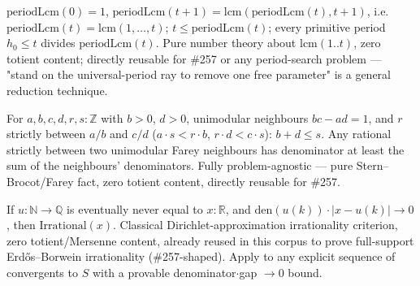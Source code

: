\begin{defn}
$\mathrm{periodLcm}(0) = 1$, $\mathrm{periodLcm}(t+1) = \mathrm{lcm}(\mathrm{periodLcm}(t), t+1)$, i.e.\ $\mathrm{periodLcm}(t) = \mathrm{lcm}(1,\dots,t)$; $t \le \mathrm{periodLcm}(t)$; every primitive period $h_0 \le t$ divides $\mathrm{periodLcm}(t)$. Pure number theory about $\mathrm{lcm}(1..t)$, zero totient content; directly reusable for \#257 or any period-search problem — "stand on the universal-period ray to remove one free parameter" is a general reduction technique.
\par\noindent{}    
\end{defn}

\begin{prop}
For $a,b,c,d,r,s:\mathbb{Z}$ with $b>0$, $d>0$, unimodular neighbours $bc-ad=1$, and $r$ strictly between $a/b$ and $c/d$ ($a\cdot s < r\cdot b$, $r\cdot d < c\cdot s$): $b+d \le s$. Any rational strictly between two unimodular Farey neighbours has denominator at least the sum of the neighbours' denominators. Fully problem-agnostic — pure Stern--Brocot/Farey fact, zero totient content, directly reusable for \#257.
\par\noindent{}   
\end{prop}

\begin{prop}
If $u:\mathbb{N}\to\mathbb{Q}$ is eventually never equal to $x:\mathbb{R}$, and $\mathrm{den}(u(k))\cdot|x - u(k)| \to 0$, then $\mathrm{Irrational}(x)$. Classical Dirichlet-approximation irrationality criterion, zero totient/Mersenne content, already reused in this corpus to prove full-support Erd\H{o}s--Borwein irrationality (\#257-shaped). Apply to any explicit sequence of convergents to $S$ with a provable denominator$\cdot$gap $\to 0$ bound.
\par\noindent{}   
\end{prop}

